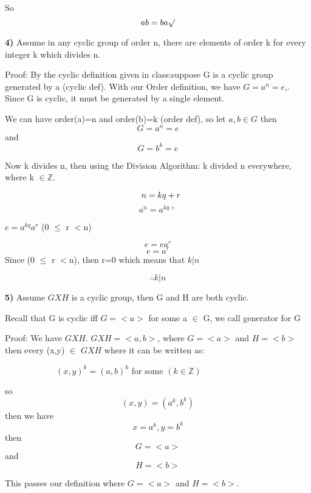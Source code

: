 \documentclass{article}
\begin{document}
So $$ab=ba \surd$$

\newpage

\textbf{4)} Assume in any cyclic group of order n, there are elements of order k for every integer k which divides n. 

\medskip

Proof: By the cyclic definition given in class:suppose G is a cyclic group generated by a (cyclic def). With our Order definition, we have $G=a^{n}=e$,. Since G is cyclic, it must be generated by a single element.

\medskip
We can have order(a)=n and order(b)=k  (order def), so let $ a,b \in G$ then $$G=a^{n}=e$$ and $$G=b^{k}=e$$


Now k divides n, then using the Division Algorithm: k divided n everywhere, where k $\in \mathbb{Z}$.

 
$$\hspace{.1in}n=kq+r$$
$$a^{n}=a^{kq+}$$
\begin{center}
\hspace{.9in} $e=a^{kq}a^{r}$  \hspace{.1in} (0 $\leq$ r $<$n)%
\end{center}
$$e=ea^{r}$$
$$e=a^{r}$$
Since (0 $\leq$ r $<$n), then r=0 which means that $k|n$

\medskip

$$\therefore k|n $$

\medskip
\newpage

\textbf{5)} Assume $GXH$ is a cyclic group, then G and H are both cyclic.


Recall that G is cyclic iff $G=<a>$ for some a $\in$ G, we call generator for G
\medskip

Proof: We have $GXH$. $GXH=<a,b>$, where $G=<a>$ and $H=<b>$ 
  then  every (x,y) $\in$ %
   $GXH$ where it can be written as: 
   
   \begin{center}
   $\hspace{1in}(x,y)^{k}=(a,b)^{k}$  \hspace{.1in} for some $(k \in \mathbb{Z})$
   \end{center}
   so $$(x,y)=(a^{k},b^{k}) $$
   then we have $$x=a^{k} , y=b^{k}$$
   then $$G=<a>$$ and $$H=<b>$$ 
   
   This passes our definition where $G=<a>$ and $H=<b>$.
\newpage
\end{document}
